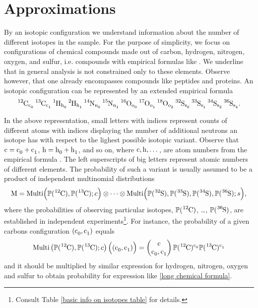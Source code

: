 \section{Approximations}

	By an isotopic configuration we understand information about the number of different isotopes in the sample. For the purpose of simplicity, we focus on configurations of chemical compounds made out of carbon, hydrogen, nitrogen, oxygen, and sulfur, i.e. compounds with empirical formulas like \molecule. We underline that in general analysis is not constrained only to these elements. Observe however, that one already encompasses compounds like peptides and proteins. An isotopic configuration can be represented by an extended empirical formula 
\begin{equation}\label{long chemical formula}
	\text{\moleculeIsotopic}.
\end{equation}

In the above representation, small letters with indices represent counts of different atoms with indices displaying the number of additional neutrons an isotope has with respect to the lighest possible isotopic variant. 
Observe that $\cem{c} = \cem{c_0} + \cem{c_1}$, $\cem{h} = \cem{h_0} + \cem{h_1}$, and so on, where $\cem{c}, \cem{h}, \dots$, are atom numbers from the empirical formula \molecule. The left superscripts of big letters represent atomic numbers of different elements. The probability of such a variant is usually assumed to be a product of independent multinomial distributions
{\small\begin{equation}\label{product of multinomials}
	\cem{M} = \mathrm{Multi} \Big( \prob(\cem{^{12}C}), \prob(\cem{^{13}C}); c \Big)
	\otimes \dots \otimes 
	\mathrm{Multi} \Big( \prob(\cem{^{32}S}), \prob(\cem{^{33}S}), \prob(\cem{^{34}S}), \prob(\cem{^{36}S}); s \Big),	
\end{equation}}
where the probabilities of observing particular isotopes, $\prob(\cem{^{12}C})$, \dots, $\prob(\cem{^{36}S})$, are established in independent experiments\footnote{Consult Table \ref{basic info on isotopes table} for details.}. For instance, the probability of a given carbons configuration $(\cem{c_0}, \cem{c_1})$ equals
\begin{equation*}
	\mathrm{Multi} \left( \prob(\cem{^{12}C}), \prob(\cem{^{13}C}); c \right)
		\Big( (\cem{c_0}, \cem{c_1}) \Big) = 
	\begin{pmatrix}
		\cem{c} \cr \cem{c_0}, \cem{c_1}  
	\end{pmatrix} \prob(\cem{^{12}C})^\cem{c_0} \prob(\cem{^{13}C})^\cem{c_1}
\end{equation*}
and it should be multiplied by similar expression for hydrogen, nitrogen, oxygen and sulfur to obtain probability for expression like \eqref{long chemical formula}.




